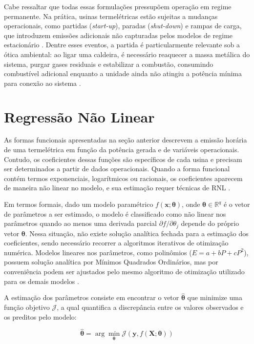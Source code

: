 Cabe ressaltar que todas essas formulações pressupõem operação em regime permanente. Na prática, usinas termelétricas estão sujeitas a mudanças operacionais, como partidas (\textit{start-up}), paradas (\textit{shut-down}) e rampas de carga, que introduzem emissões adicionais não capturadas pelos modelos de regime estacionário \cite{kumar2012}. Dentre esses eventos, a partida é particularmente relevante sob a ótica ambiental: ao ligar uma caldeira, é necessário reaquecer a massa metálica do sistema, purgar gases residuais e estabilizar a combustão, consumindo combustível adicional enquanto a unidade ainda não atingiu a potência mínima para conexão ao sistema \cite{kumar2012}.

\section{Regressão Não Linear}

As formas funcionais apresentadas na seção anterior descrevem a emissão horária de uma termelétrica em função da potência gerada e de variáveis operacionais. Contudo, os coeficientes dessas funções são específicos de cada usina e precisam ser determinados a partir de dados operacionais. Quando a forma funcional contém termos exponenciais, logarítmicos ou racionais, os coeficientes aparecem de maneira não linear no modelo, e sua estimação requer técnicas de \ac{RNL} \cite{seber1989nonlinear}.

Em termos formais, dado um modelo paramétrico \(f(\mathbf{x}; \boldsymbol{\theta})\), onde \(\boldsymbol{\theta} \in \mathbb{R}^q\) é o vetor de parâmetros a ser estimado, o modelo é classificado como não linear nos parâmetros quando ao menos uma derivada parcial \(\partial f/\partial \theta_j\) depende do próprio vetor \(\boldsymbol{\theta}\). Nessa situação, não existe solução analítica fechada para a estimação dos coeficientes, sendo necessário recorrer a algoritmos iterativos de otimização numérica. Modelos lineares nos parâmetros, como polinômios (\(E = a + bP + cP^2\)), possuem solução analítica por Mínimos Quadrados Ordinários, mas por conveniência podem ser ajustados pelo mesmo algoritmo de otimização utilizado para os demais modelos \cite{seber1989nonlinear}.

A estimação dos parâmetros consiste em encontrar o vetor \(\hat{\boldsymbol{\theta}}\) que minimize uma função objetivo \(\mathcal{J}\), a qual quantifica a discrepância entre os valores observados e os preditos pelo modelo:

\begin{equation}
\hat{\boldsymbol{\theta}} = \arg \min_{\boldsymbol{\theta}} \mathcal{J}(\mathbf{y}, f(\mathbf{X}; \boldsymbol{\theta}))
\label{eq:estimacao_rnl}
\end{equation}

